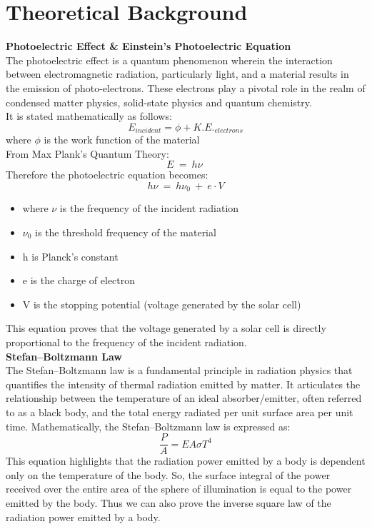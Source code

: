 \chapter{Theoretical Background}

\textbf{Photoelectric Effect \& Einstein's Photoelectric Equation}\smallskip \\
The photoelectric effect is a quantum phenomenon wherein the interaction between electromagnetic radiation, particularly light, and a material results in the emission of photo-electrons. These electrons play a pivotal role in the realm of condensed matter physics, solid-state physics and quantum chemistry.\\
It is stated mathematically as follows:
\[
E_{incident} = \phi + K.E._{electrons}
\]
\hspace{9cm} where $\phi$ is the work function of the material\\
From Max Plank's Quantum Theory:
\[
E \ = \ h \nu \
\]
Therefore the photoelectric equation becomes:
\[
h \nu \ = \ h \nu_0 \ + \ e \cdot V
\]
\begin{itemize}
    \item where $\nu$ is the frequency of the incident radiation
    \item $\nu_0$ is the threshold frequency of the material
    \item h is Planck's constant
    \item e is the charge of electron
    \item V is the stopping potential (voltage generated by the solar cell)
\end{itemize}
This equation proves that the voltage generated by a solar cell is directly proportional to the frequency of the incident radiation.\medskip \\
\textbf{Stefan–Boltzmann Law} \smallskip \\
The Stefan–Boltzmann law is a fundamental principle in radiation physics that quantifies the intensity of thermal radiation emitted by matter. It articulates the relationship between the temperature of an ideal absorber/emitter, often referred to as a black body, and the total energy radiated per unit surface area per unit time.
Mathematically, the Stefan–Boltzmann law is expressed as:
\[
\frac{P}{A} = E A \sigma T^4
\]
This equation highlights that the radiation power emitted by a body is dependent only on the temperature of the body. So, the surface integral of the power received over the entire area of the sphere of illumination is equal to the power emitted by the body. Thus we can also prove the inverse square law of the radiation power emitted by a body.\\
\vfill
\pagebreak
